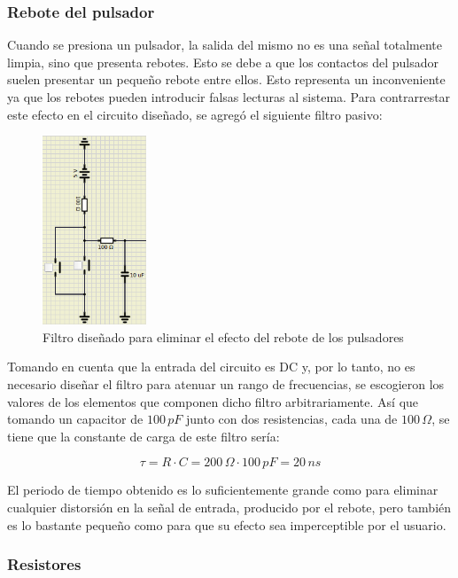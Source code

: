 \subsubsection{Rebote del pulsador}

Cuando se presiona un pulsador, la salida del mismo no es una señal totalmente limpia, sino que presenta rebotes. Esto se debe a que los contactos del pulsador suelen presentar un pequeño rebote entre ellos. Esto representa un inconveniente ya que los rebotes pueden introducir falsas lecturas al sistema. Para contrarrestar este efecto en el circuito diseñado, se agregó el siguiente filtro pasivo: 

\begin{figure}[H]
    \centering
    \includegraphics[width=0.275\textwidth]{images/filtro.png}
    \caption{Filtro diseñado para eliminar el efecto del rebote de los pulsadores}
    \label{filtro}
\end{figure}


Tomando en cuenta que la entrada del circuito es DC y, por lo tanto, no es necesario diseñar el filtro para atenuar un rango de frecuencias, se escogieron los valores de los elementos que componen dicho filtro arbitrariamente. Así que tomando un capacitor de $100\,pF$ junto con dos resistencias, cada una de $100\,\Omega$, se tiene que la constante de carga de este filtro sería:

\begin{equation}
    \tau = R \cdot C = 200\,\Omega \cdot 100\,pF = 20\,ns
\end{equation}

El periodo de tiempo obtenido es lo suficientemente grande como para eliminar cualquier distorsión en la señal de entrada, producido por el rebote, pero también es lo bastante pequeño como para que su efecto sea imperceptible por el usuario.

\subsubsection{Resistores}

